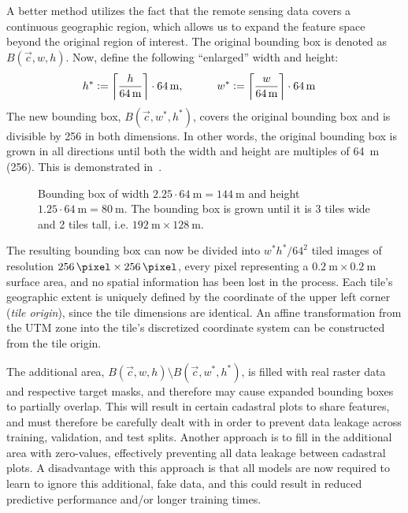 A better method utilizes the fact that the remote sensing data covers a continuous geographic region, which allows us to expand the feature space beyond the original region of interest.
The original bounding box is denoted as $B(\vec{c}, w, h)$.
Now, define the following \enquote{enlarged} width and height:
%
\begin{align*}
  h^* &:= \left\lceil \frac{h}{\SI{64}{\meter}} \right\rceil \cdot \SI{64}{\meter},
  \hspace{3em}
  w^* := \left\lceil \frac{w}{\SI{64}{\meter}} \right\rceil \cdot \SI{64}{\meter}
\end{align*}
%
The new bounding box, $B(\vec{c}, w^*, h^*)$, covers the original bounding box and is divisible by \SI{256}{\pixel} in both dimensions.
In other words, the original bounding box is grown in all directions until both the width and height are multiples of \SI{64}{\meter} (\SI{256}{\pixel}).
This is demonstrated in~.

\begin{figure}[H]
  \centering
  
  \caption{%
    Bounding box of width $2.25 \cdot \SI{64}{\meter} = \SI{144}{\meter}$ and height $1.25 \cdot \SI{64}{\meter} = \SI{80}{\meter}$.
    The bounding box is grown until it is 3 tiles wide and 2 tiles tall, i.e. $\SI{192}{\meter} \times \SI{128}{\meter}$.
  }%
  \label{fig:bbox-growing}
\end{figure}

The resulting bounding box can now be divided into $w^*h^* / 64^2$ tiled images of resolution $\SI{256}{\pixel} \times \SI{256}{\pixel}$, every pixel representing a $\SI{0.2}{\meter} \times \SI{0.2}{\meter}$ surface area, and no spatial information has been lost in the process.
Each tile's geographic extent is uniquely defined by the coordinate of the upper left corner (\textit{tile origin}), since the tile dimensions are identical.
An affine transformation from the UTM zone into the tile's discretized coordinate system can be constructed from the tile origin.

The additional area, $B(\vec{c}, w, h) \setminus B(\vec{c}, w^*, h^*)$, is filled with real raster data and respective target masks, and therefore may cause expanded bounding boxes to partially overlap.
This will result in certain cadastral plots to share features, and must therefore be carefully dealt with in order to prevent data leakage across training, validation, and test splits.
Another approach is to fill in the additional area with zero-values, effectively preventing all data leakage between cadastral plots.
A disadvantage with this approach is that all models are now required to learn to ignore this additional, fake data, and this could result in reduced predictive performance and/or longer training times.

